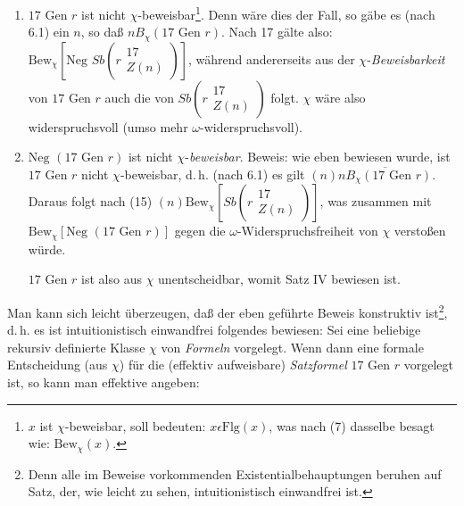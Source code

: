 \documentclass[draft]{scrartcl}
\begin{document}
\begin{enumerate}
	\item $17 \text{ Gen } r$ ist nicht $\chi$-beweisbar\footnote{$x$ 
		ist $\chi$-beweisbar, soll bedeuten: $x \epsilon \text{Flg}\left(x\right)$, 
		was nach (7) dasselbe besagt wie: $\text{Bew}_\chi\left(x\right)$.}. Denn 
		wäre dies der Fall, so gäbe es (nach 6.1) ein $n$, so daß 
		$n B_\chi \left(17 \text{ Gen } r\right)$. Nach 17 gälte also: 
		$\text{Bew}_\chi \left[\text{Neg }Sb\left(r\substack{17\\ Z\left(n\right)}\right)\right]$, 
		während andererseits aus der $\chi$-\textit{Beweisbarkeit} von $17 \text{ Gen } r$ auch 
		die von $Sb \left(r\substack{17\\ Z\left(n\right)}\right)$ folgt. $\chi$ wäre also 
		widerspruchsvoll (umso mehr $\omega$-widerspruchsvoll).

	\item $\text{Neg }\left(17 \text{ Gen } r\right)$ ist nicht 
		$\chi$-\textit{beweisbar}. Beweis: wie eben bewiesen wurde, 
		ist $17 \text{ Gen } r$ nicht $\chi$-beweisbar, d.\,h. 
		(nach 6.1) es gilt $\left(n\right)\overline{n B_\chi\left(17\text{ Gen } r\right)}$. 
		Daraus folgt nach (15) $\left(n\right) \text{Bew}_\chi\left[Sb\left(r\substack{17\\ Z\left(n\right)}\right)\right]$,
		was zusammen mit $\text{Bew}_\chi\left[\text{Neg }\left(17 \text{ Gen } r\right)\right]$ 
		gegen die $\omega$-Widerspruchsfreiheit von $\chi$ verstoßen würde.

	$17\text{ Gen } r$ ist also aus $\chi$ unentscheidbar, womit Satz IV bewiesen ist.
\end{enumerate}

\let\originalfootnote=\thefootnote
\let\thefootnote=\fnfunfundvierziga
Man kann sich leicht überzeugen,
daß der eben geführte Beweis konstruktiv ist\footnote{Denn alle im Beweise 
vorkommenden Existentialbehauptungen beruhen auf Satz, der, wie leicht zu sehen,
intuitionistisch einwandfrei ist.},
\let\thefootnote=\originalfootnote
\setcounter{footnote}{45}
d.\,h. es ist intuitionistisch einwandfrei folgendes bewiesen:
Sei eine beliebige rekursiv definierte Klasse $\chi$ 
von \textit{Formeln} vorgelegt. Wenn dann eine formale Entscheidung (aus $\chi$) für die (effektiv aufweisbare)
\textit{Satzformel} $17 \text{ Gen } r$ vorgelegt ist, so kann man effektive angeben:
\end{document}
